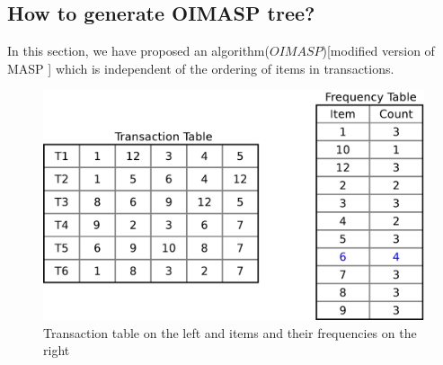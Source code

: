 \documentclass[5p, twocolumn]{elsarticle}
\begin{document}
\subsection{How to generate OIMASP tree?}
In this section, we have proposed an algorithm($ OIMASP $)[modified version of MASP \cite{oldmasp}] which is independent of the ordering of items in transactions.

\begin{figure}
\begin{center}
\includegraphics[scale=0.25]{pdf/itemfreq}
\end{center}
\caption{Transaction table on the left and items and their frequencies on the right}
\label{Fig 5}
\end{figure}
\end{document}
